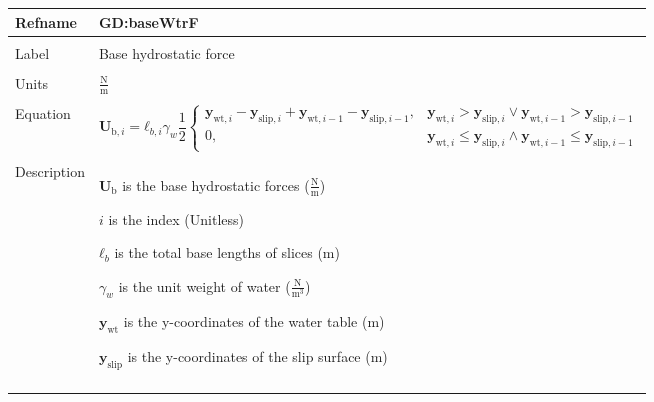 \documentclass[12pt]{article}
\begin{document}
\noindent \begin{minipage}{\textwidth}
\begin{tabular}{>{\raggedright}p{}>{\raggedright\arraybackslash}p{}}
\toprule \textbf{Refname} & \textbf{GD:baseWtrF}
\label{GD:baseWtrF}
\\ \midrule \\
Label & Base hydrostatic force
\\ \midrule \\
Units & $\frac{\text{N}}{\text{m}}$
\\ \midrule \\
Equation & \begin{displaymath}
           {\mathbf{U}_{\text{b},i}}={\mathbf{ℓ}_{b,i}} {γ_{w}} \frac{1}{2} \begin{cases}
                                                                            {\mathbf{y}_{\text{wt},i}}-{\mathbf{y}_{\text{slip},i}}+{\mathbf{y}_{\text{wt},i-1}}-{\mathbf{y}_{\text{slip},i-1}}, & {\mathbf{y}_{\text{wt},i}}>{\mathbf{y}_{\text{slip},i}}\lor{}{\mathbf{y}_{\text{wt},i-1}}>{\mathbf{y}_{\text{slip},i-1}}\\
0, & {\mathbf{y}_{\text{wt},i}}\leq{}{\mathbf{y}_{\text{slip},i}}\land{}{\mathbf{y}_{\text{wt},i-1}}\leq{}{\mathbf{y}_{\text{slip},i-1}}
                                                                            \end{cases}
           \end{displaymath}
\\ \midrule \\
Description & \begin{symbDescription}
              \item{${\mathbf{U}_{\text{b}}}$ is the base hydrostatic forces ($\frac{\text{N}}{\text{m}}$)}
              \item{$i$ is the index (Unitless)}
              \item{${\mathbf{ℓ}_{b}}$ is the total base lengths of slices (m)}
              \item{${γ_{w}}$ is the unit weight of water ($\frac{\text{N}}{\text{m}^{3}}$)}
              \item{${\mathbf{y}_{\text{wt}}}$ is the y-coordinates of the water table (m)}
              \item{${\mathbf{y}_{\text{slip}}}$ is the y-coordinates of the slip surface (m)}
              \end{symbDescription}
\\ \midrule \\

\end{tabular}
\end{minipage}
\end{document}
